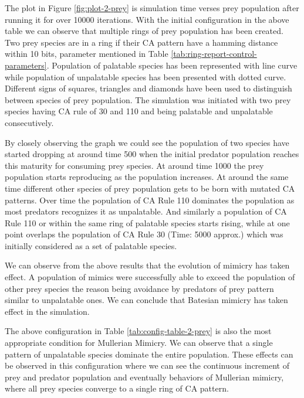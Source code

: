 The plot in Figure \ref{fig:plot-2-prey} is simulation time verses prey population after running it for over 10000 iterations. With the initial configuration in the above table we can observe that multiple rings of prey population has been created. Two prey species are in a ring if their CA pattern have a hamming distance within 10 bits, parameter mentioned in Table \ref{tab:ring-report-control-parameters}. Population of palatable species has been represented with line curve while population of unpalatable species has been presented with dotted curve. Different signs of squares, triangles and diamonds have been used to distinguish between species of prey population. The simulation was initiated with two prey species having CA rule of 30 and 110 and being palatable and unpalatable consecutively.

By closely observing the graph we could see the population of two species have started dropping at around time 500 when the initial predator population reaches this maturity for consuming prey species. At around time 1000 the prey population starts reproducing as the population increases. At around the same time different other species of prey population gets to be born with mutated CA patterns. Over time the population of CA Rule 110 dominates the population as most predators recognizes it as unpalatable. And similarly a population of CA Rule 110 or within the same ring of palatable species starts rising, while at one point overlaps the population of CA Rule 30 (Time: 5000 approx.) which was initially considered as a set of palatable species.

We can observe from the above results that the evolution of mimicry has taken effect. A population of mimics were successfully able to exceed the population of other prey species the reason being avoidance by predators of prey pattern similar to unpalatable ones. We can conclude that Batesian mimicry has taken effect in the simulation.

The above configuration in Table \ref{tab:config-table-2-prey} is also the most appropriate condition for Mullerian Mimicry. We can observe that a single pattern of unpalatable species dominate the entire population. These effects can be observed in this configuration where we can see the continuous increment of prey and predator population and eventually behaviors of Mullerian mimicry, where all prey species converge to a single ring of CA pattern.

